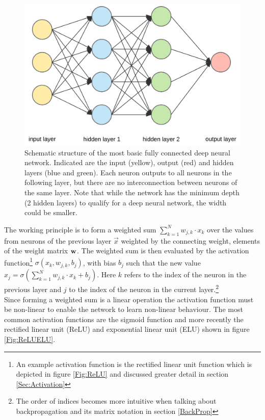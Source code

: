 			\begin{figure}
				\includegraphics[width=\textwidth]{images/simpleNN.png}
				\caption{Schematic structure of the most basic fully connected deep neural network. Indicated are the input (yellow), output (red) and hidden layers (blue and green). Each neuron outputs to all neurons in the following layer, but there are no interconnection between neurons of the same layer. Note that while the network has the minimum depth (2 hidden layers) to qualify for a deep neural network, the width  could be smaller.}
				\label{Img_NNFully}
			\end{figure}

			The working principle is to form a weighted sum $\sum_{k=1}^{N} w_{j,k} \cdot x_{k}$ over the values from neurons of the previous layer $\vec{x}$ weighted by the connecting weight, elements of the weight matrix $\mathbf{w}$. The weighted sum is then evaluated by the activation function\footnote{An example activation function is the rectified linear unit function which is depicted in figure \ref{Fig:ReLU} and discussed greater detail in section \ref{Sec:Activation}} $\sigma(x_{k}, w_{j,k}, b_{j})$, with bias $b_j$ such that the new value $x_j = \sigma(\sum_{k=1}^{N} w_{j,k} \cdot x_{k} + b_j)$. Here $k$ refers to the index of the neuron in the previous layer and $j$ to the index of the neuron in the current layer.\footnote{The order of indices becomes more intuitive when talking about backpropagation and its matrix notation in section \ref{BackProp}}\\
			Since forming a weighted sum is a linear operation the activation function must be non-linear to enable the network to learn non-linear behaviour. The most common activation functions are the sigmoid function and more recently the rectified linear unit (ReLU) and exponential linear unit (ELU) shown in figure \ref{Fig:ReLUELU}.\\
		
